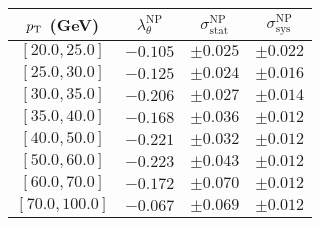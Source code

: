 \begin{tabular}{c||c||c|c}
$p_\text{T}$ (GeV) & $\lambda_\theta^{\text{NP}}$ & $\sigma_{\text{stat}}^{\text{NP}}$ & $\sigma_{\text{sys}}^{\text{NP}}$  \\
\hline
$[20.0, 25.0]$& $-0.105$ & $\pm0.025$ & $\pm0.022$\\
$[25.0, 30.0]$& $-0.125$ & $\pm0.024$ & $\pm0.016$\\
$[30.0, 35.0]$& $-0.206$ & $\pm0.027$ & $\pm0.014$\\
$[35.0, 40.0]$& $-0.168$ & $\pm0.036$ & $\pm0.012$\\
$[40.0, 50.0]$& $-0.221$ & $\pm0.032$ & $\pm0.012$\\
$[50.0, 60.0]$& $-0.223$ & $\pm0.043$ & $\pm0.012$\\
$[60.0, 70.0]$& $-0.172$ & $\pm0.070$ & $\pm0.012$\\
$[70.0, 100.0]$& $-0.067$ & $\pm0.069$ & $\pm0.012$\\
\end{tabular}
